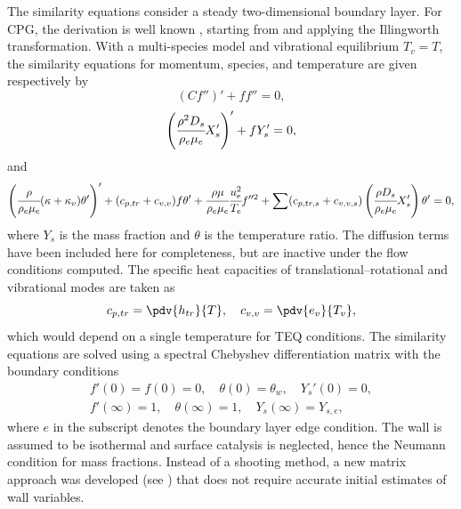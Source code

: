The similarity equations consider a steady two-dimensional boundary layer. For CPG, the derivation is well known \citep{White2005}, starting from  and applying the Illingworth transformation. With a multi-species model and vibrational equilibrium $T_v = T$, the similarity equations for momentum, species, and temperature are given respectively by
\begin{equation}\label{equation:similarity:momentum}
    (C f'')' + f f'' = 0,
\end{equation}
\begin{equation}\label{equation:similarity:species}
    \left(\cfrac{\rho^2 D_s}{\rho_e \mu_e} X'_s\right)' + f Y'_s = 0,
\end{equation}
and
\begin{equation}\label{equation:similarity:teq_energy}
     \left(\cfrac{\rho}{\rho_e \mu_e} (\kappa + \kappa_v) \theta'\right)' + (c_{p,tr} + c_{v,v}) f \theta' + \cfrac{\rho \mu}{\rho_e \mu_e} \cfrac{u_{e}^{2}}{T_e} f''^{2} + \sum (c_{p,tr,s} + c_{v,v,s}) \left(\cfrac{\rho D_s}{\rho_e \mu_e} X'_s\right) \theta' = 0,
\end{equation}
where $Y_s$ is the mass fraction and $\theta$ is the temperature ratio. The diffusion terms have been included here for completeness, but are inactive under the flow conditions computed. The specific heat capacities of translational--rotational and vibrational modes are taken as
\begin{equation}
    c_{p,tr} = \pdv{h_{tr}}{T}, \quad c_{v,v} = \pdv{e_{v}}{T_{v}},
\end{equation}
which would depend on a single temperature for TEQ conditions. The similarity equations are solved using a spectral Chebyshev differentiation matrix with the boundary conditions
\begin{gather}\label{eq:bc1}
    f'(0) = f(0) = 0, \quad \theta(0) = \theta_w, \quad Y_s'(0) = 0, \\
    f'(\infty) = 1, \quad \theta(\infty) = 1, \quad Y_s(\infty) = Y_{s,e},
\end{gather}
where $e$ in the subscript denotes the boundary layer edge condition. The wall is assumed to be isothermal and surface catalysis is neglected, hence the Neumann condition for mass fractions. Instead of a shooting method, a new matrix approach was developed (see ) that does not require accurate initial estimates of wall variables.

